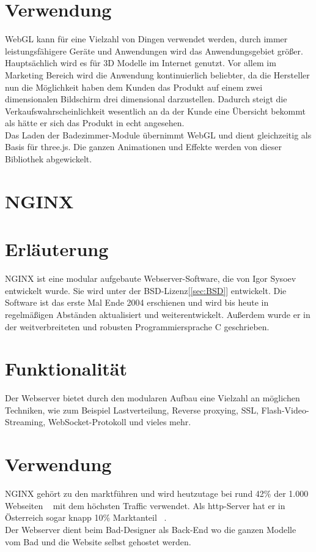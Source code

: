 \section*{Verwendung}
WebGL kann für eine Vielzahl von Dingen verwendet werden, durch immer leistungsfähigere Geräte und Anwendungen wird das Anwendungsgebiet größer. Hauptsächlich wird es für 3D Modelle im Internet genutzt. Vor allem im Marketing Bereich wird die Anwendung kontinuierlich beliebter, da die Hersteller nun die Möglichkeit haben dem Kunden das Produkt auf einem zwei dimensionalen Bildschirm drei dimensional darzustellen. Dadurch steigt die Verkaufswahrscheinlichkeit wesentlich an da der Kunde eine Übersicht bekommt als hätte er sich das Produkt in echt angesehen.
\\
Das Laden der Badezimmer-Module übernimmt WebGL und dient gleichzeitig als Basis für three.js. Die ganzen Animationen und Effekte werden von dieser Bibliothek abgewickelt.



\newpage
\clearpage  

\section{NGINX}\label{sec:NGINX}
\section*{Erläuterung} 
NGINX ist eine modular aufgebaute Webserver-Software, die von Igor Sysoev entwickelt wurde. Sie wird unter der BSD-Lizenz[\ref{sec:BSD}] entwickelt. Die Software ist das erste Mal Ende 2004 erschienen und wird bis heute in regelmäßigen Abständen aktualisiert und weiterentwickelt. Außerdem wurde er in der weitverbreiteten und robusten Programmiersprache C geschrieben.

\section*{Funktionalität}
Der Webserver bietet durch den modularen Aufbau eine Vielzahl an möglichen Techniken, wie zum Beispiel Lastverteilung, Reverse proxying, SSL, Flash-Video-Streaming, WebSocket-Protokoll und vieles mehr. 


\section*{Verwendung}
NGINX gehört zu den marktführen und wird heutzutage bei rund
 42\% der 1.000 Webseiten ~\cite{nginxWorldWide} mit dem höchsten Traffic verwendet. 
 Als http-Server hat er in Österreich sogar knapp 10\% Marktanteil ~\cite{nginxAT}. 
\\
Der Webserver dient beim Bad-Designer als Back-End wo die ganzen Modelle vom Bad und die Website selbst gehostet werden.



